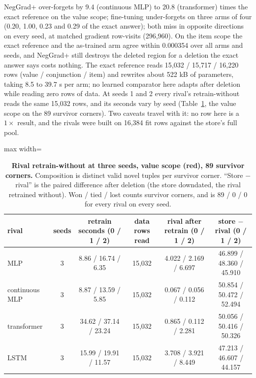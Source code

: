 \documentclass{article} %
\begin{document}
\noindent NegGrad+ over-forgets by 9.4 (continuous MLP) to 20.8 (transformer) times the exact
reference on the value scope; fine-tuning under-forgets on three arms of four (0.20, 1.00, 0.23 and
0.29 of the exact answer); both miss in opposite directions on every seed, at matched gradient
row-visits (296,960). On the item scope the exact reference and the as-trained arm agree within
0.000354 over all arms and seeds, and NegGrad+ still destroys the deleted region for a deletion the
exact answer says costs nothing. The exact reference reads 15,032 / 15,717 / 16,220 rows (value /
conjunction / item) and rewrites about 522 kB of parameters, taking 8.5 to 39.7 s per arm; no learned
comparator here adapts after deletion while reading zero rows of data.
At seeds 1 and 2 every rival's retrain-without reads the same 15,032 rows, and its seconds vary by
seed (Table~\ref{tab:rivals-del-seeds}, the value scope on the 89 survivor corners). Two caveats
travel with it: no row here is a $1\times$ result, and the rivals were built on 16,384 fit rows
against the store's full pool.

\begin{table}[h]
\centering\small
\caption{\textbf{Rival retrain-without at three seeds, value scope (red), 89 survivor corners.} %
Composition is distinct valid novel tuples per survivor corner. ``Store $-$ rival'' is the paired
difference after deletion (the store downdated, the rival retrained without). Won / tied / lost
counts survivor corners, and is 89 / 0 / 0 for every rival on every seed.} %
\label{tab:rivals-del-seeds}
\setlength{\tabcolsep}{3pt}
\begin{adjustbox}{max width=\linewidth}\begin{tabular}{lccccc}
\toprule
rival & seeds & retrain seconds (0 / 1 / 2) & data rows read & rival after retrain (0 / 1 / 2) & store $-$ rival (0 / 1 / 2) \\
\midrule
MLP & 3 & 8.86 / 16.74 / 6.35 & 15,032 & 4.022 / 2.169 / 6.697 & 46.899 / 48.360 / 45.910 \\
continuous MLP & 3 & 8.87 / 13.59 / 5.85 & 15,032 & 0.067 / 0.056 / 0.112 & 50.854 / 50.472 / 52.494 \\
transformer & 3 & 34.62 / 37.14 / 23.24 & 15,032 & 0.865 / 0.112 / 2.281 & 50.056 / 50.416 / 50.326 \\
LSTM & 3 & 15.99 / 19.91 / 11.57 & 15,032 & 3.708 / 3.921 / 8.449 & 47.213 / 46.607 / 44.157 \\
\bottomrule
\end{tabular}\end{adjustbox}
\end{table}
\end{document}
